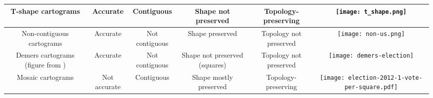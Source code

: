 \documentclass{egpubl}
\begin{document}
{\begin{table*}[htbp]
\begin{tabular}{|c|c|c|c|c|c|}
\hline


\parbox{0.135\textwidth}{\centering T-shape cartograms \cite{ourSoCG}
} &
	\parbox{0.08\textwidth}{\centering Accurate} &
	\parbox{0.088\textwidth}{\centering Contiguous} &
	\parbox{0.1\textwidth}{\centering  Shape not preserved} &
	\parbox{0.155\textwidth}{\centering Topology-preserving} &
\parbox{0.19\textwidth}{\vspace{0.1cm}\texttt{[image: t\_shape.png]}}\\

\hline


\parbox{0.135\textwidth}{\centering Non-contiguous cartograms \cite{Olson}} &
	\parbox{0.08\textwidth}{\centering Accurate} &
	\parbox{0.088\textwidth}{\centering Not\\contiguous} &
	\parbox{0.1\textwidth}{\centering Shape preserved} &
	\parbox{0.155\textwidth}{\hspace{-0.1cm}\parbox{0.165\textwidth}{\centering Topology not preserved}} &
	\parbox{0.18\textwidth}{\vspace{0.1cm}\texttt{[image: non-us.png]}}\\

\hline


\parbox{0.135\textwidth}{\centering Demers cartograms \cite{Demers} (figure from \cite{NYT2012-elec})} &
	\parbox{0.08\textwidth}{\centering Accurate} &
\parbox{0.088\textwidth}{\centering Not\\contiguous} &
	\parbox{0.1\textwidth}{\centering  Shape not preserved (squares)} &
	\parbox{0.155\textwidth}{\centering Topology not preserved} &
\parbox{0.19\textwidth}{\vspace{0.1cm}\texttt{[image: demers-election]}}\\

\hline




\parbox{0.135\textwidth}{\centering Mosaic cartograms \cite{cano2015mosaic}
} &
	\parbox{0.08\textwidth}{\centering Not accurate} &
\parbox{0.088\textwidth}{\centering Contiguous} &
	\parbox{0.1\textwidth}{\centering  Shape mostly preserved} &
\parbox{0.155\textwidth}{\centering Topology-preserving} &
\parbox{0.22\textwidth}{\vspace{0.1cm}\texttt{[image: election-2012-1-vote-per-square.pdf]}}\\

\hline




\end{tabular}
\end{table*}}
\end{document}
